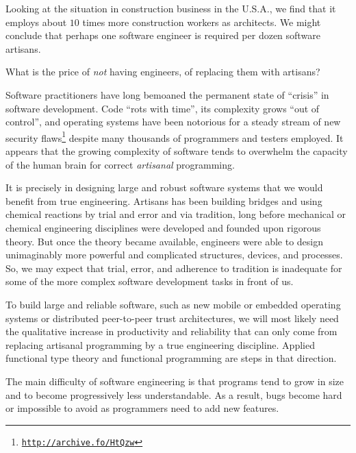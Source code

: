 Looking at the situation in construction business in the U.S.A., we
find that it employs about $10$ times more construction workers as
architects. We might conclude that perhaps one software engineer is
required per dozen software artisans.

What is the price of \emph{not} having engineers, of replacing them
with artisans?

Software practitioners have long bemoaned the permanent state of \textsf{``}crisis\textsf{''}
in software development. Code \textsf{``}rots with time\textsf{''}, its complexity
grows \textsf{``}out of control\textsf{''}, and operating systems have been notorious
for a steady stream of new security flaws\footnote{\texttt{\href{http://archive.fo/HtQzw}{http://archive.fo/HtQzw}}}
despite many thousands of programmers and testers employed. It appears
that the growing complexity of software tends to overwhelm the capacity
of the human brain for correct \emph{artisanal} programming.

It is precisely in designing large and robust software systems that
we would benefit from true engineering. Artisans has been building
bridges and using chemical reactions by trial and error and via tradition,
long before mechanical or chemical engineering disciplines were developed
and founded upon rigorous theory. But once the theory became available,
engineers were able to design unimaginably more powerful and complicated
structures, devices, and processes. So, we may expect that trial,
error, and adherence to tradition is inadequate for some of the more
complex software development tasks in front of us. 

To build large and reliable software, such as new mobile or embedded
operating systems or distributed peer-to-peer trust architectures,
we will most likely need the qualitative increase in productivity
and reliability that can only come from replacing artisanal programming
by a true engineering discipline. Applied functional type theory and
functional programming are steps in that direction.


The main difficulty of software engineering is that programs tend
to grow in size and to become progressively less understandable. As
a result, bugs become hard or impossible to avoid as programmers need
to add new features. 

